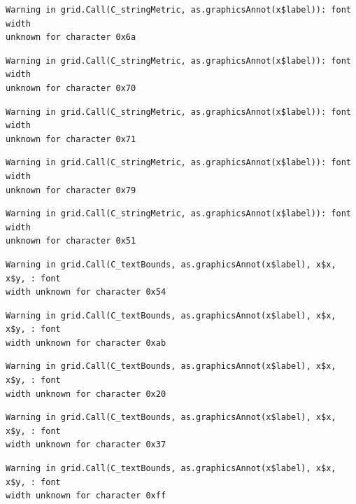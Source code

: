 \documentclass[
  letterpaper,
]{scrbook}
\begin{document}
\begin{verbatim}
Warning in grid.Call(C_stringMetric, as.graphicsAnnot(x$label)): font width
unknown for character 0x6a
\end{verbatim}

\begin{verbatim}
Warning in grid.Call(C_stringMetric, as.graphicsAnnot(x$label)): font width
unknown for character 0x70
\end{verbatim}

\begin{verbatim}
Warning in grid.Call(C_stringMetric, as.graphicsAnnot(x$label)): font width
unknown for character 0x71
\end{verbatim}

\begin{verbatim}
Warning in grid.Call(C_stringMetric, as.graphicsAnnot(x$label)): font width
unknown for character 0x79
\end{verbatim}

\begin{verbatim}
Warning in grid.Call(C_stringMetric, as.graphicsAnnot(x$label)): font width
unknown for character 0x51
\end{verbatim}

\begin{verbatim}
Warning in grid.Call(C_textBounds, as.graphicsAnnot(x$label), x$x, x$y, : font
width unknown for character 0x54
\end{verbatim}

\begin{verbatim}
Warning in grid.Call(C_textBounds, as.graphicsAnnot(x$label), x$x, x$y, : font
width unknown for character 0xab
\end{verbatim}

\begin{verbatim}
Warning in grid.Call(C_textBounds, as.graphicsAnnot(x$label), x$x, x$y, : font
width unknown for character 0x20
\end{verbatim}

\begin{verbatim}
Warning in grid.Call(C_textBounds, as.graphicsAnnot(x$label), x$x, x$y, : font
width unknown for character 0x37
\end{verbatim}

\begin{verbatim}
Warning in grid.Call(C_textBounds, as.graphicsAnnot(x$label), x$x, x$y, : font
width unknown for character 0xff
\end{verbatim}
\end{document}
